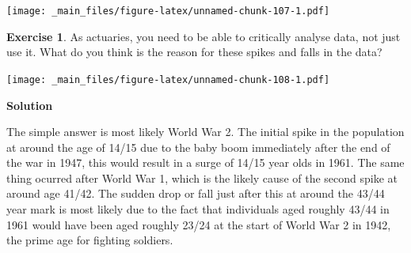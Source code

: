 \documentclass[
]{book}
\newenvironment{Shaded}{\begin{snugshade}}{\end{snugshade}}
\newcommand{\AttributeTok}[1]{\textcolor[rgb]{0.77,0.63,0.00}{#1}}
\newcommand{\DecValTok}[1]{\textcolor[rgb]{0.00,0.00,0.81}{#1}}
\newcommand{\FunctionTok}[1]{\textcolor[rgb]{0.00,0.00,0.00}{#1}}
\newcommand{\NormalTok}[1]{#1}
\newcommand{\SpecialCharTok}[1]{\textcolor[rgb]{0.00,0.00,0.00}{#1}}
\newcommand{\StringTok}[1]{\textcolor[rgb]{0.31,0.60,0.02}{#1}}
\theoremstyle{definition}
\theoremstyle{definition}
\theoremstyle{definition}
\newtheorem{exercise}{Exercise}[chapter]
\theoremstyle{definition}
\theoremstyle{remark}
\begin{document}
\begin{Shaded}
\end{Shaded}

\texttt{[image: \_main\_files/figure-latex/unnamed-chunk-107-1.pdf]}

\begin{exercise}
As actuaries, you need to be able to critically analyse data, not just use it. What do you think is the reason for these spikes and falls in the data?

\begin{Shaded}
\end{Shaded}

\texttt{[image: \_main\_files/figure-latex/unnamed-chunk-108-1.pdf]}
\end{exercise}

\textbf{Solution}

The simple answer is most likely World War 2. The initial spike in the population at around the age of 14/15 due to the baby boom immediately after the end of the war in 1947, this would result in a surge of 14/15 year olds in 1961. The same thing ocurred after World War 1, which is the likely cause of the second spike at around age 41/42. The sudden drop or fall just after this at around the 43/44 year mark is most likely due to the fact that individuals aged roughly 43/44 in 1961 would have been aged roughly 23/24 at the start of World War 2 in 1942, the prime age for fighting soldiers.
\end{document}
